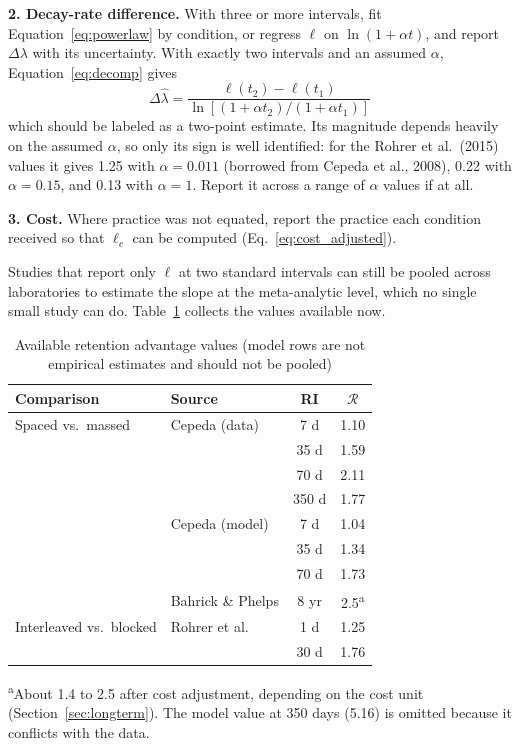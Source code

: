 \documentclass[10pt,twocolumn]{article}
\newcommand{\effr}{\mathcal{R}}
\newcommand{\lr}{\ell}
\begin{document}
\textbf{2. Decay-rate difference.} With three or more intervals, fit Equation~\ref{eq:powerlaw} by condition, or regress $\lr$ on $\ln(1+\alpha t)$, and report $\Delta\lambda$ with its uncertainty. With exactly two intervals and an assumed $\alpha$, Equation~\ref{eq:decomp} gives
\begin{equation}
\Delta\hat{\lambda} = \frac{\lr(t_2) - \lr(t_1)}{\ln[(1+\alpha t_2)/(1+\alpha t_1)]}
\label{eq:delta_lambda_twopoint}
\end{equation}
which should be labeled as a two-point estimate. Its magnitude depends heavily on the assumed $\alpha$, so only its sign is well identified: for the Rohrer et al.\ (2015) values it gives 1.25 with $\alpha = 0.011$ (borrowed from Cepeda et al., 2008), 0.22 with $\alpha = 0.15$, and 0.13 with $\alpha = 1$. Report it across a range of $\alpha$ values if at all.

\textbf{3. Cost.} Where practice was not equated, report the practice each condition received so that $\lr_c$ can be computed (Eq.~\ref{eq:cost_adjusted}).

Studies that report only $\lr$ at two standard intervals can still be pooled across laboratories to estimate the slope at the meta-analytic level, which no single small study can do. Table~\ref{tab:summary} collects the values available now.

\begin{table}[!htbp]
\centering
\caption{Available retention advantage values (model rows are not empirical estimates and should not be pooled)}
\label{tab:summary}
\footnotesize
\setlength{\tabcolsep}{4pt}
\begin{tabular}{@{}llcc@{}}
\toprule
Comparison & Source & RI & $\effr$ \\
\midrule
Spaced vs.\ massed & Cepeda (data) & 7 d & 1.10 \\
 & & 35 d & 1.59 \\
 & & 70 d & 2.11 \\
 & & 350 d & 1.77 \\
 & Cepeda (model) & 7 d & 1.04 \\
 & & 35 d & 1.34 \\
 & & 70 d & 1.73 \\
 & Bahrick \& Phelps & 8 yr & 2.5\textsuperscript{a} \\
Interleaved vs.\ blocked & Rohrer et al. & 1 d & 1.25 \\
 & & 30 d & 1.76 \\
\bottomrule
\end{tabular}

\vspace{0.3em}
\raggedright
\footnotesize
\textsuperscript{a}About 1.4 to 2.5 after cost adjustment, depending on the cost unit (Section~\ref{sec:longterm}). The model value at 350 days (5.16) is omitted because it conflicts with the data.
\end{table}
\end{document}
